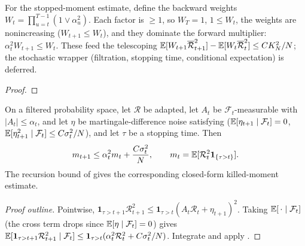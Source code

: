 \begin{lemma}
  \label{lem:back-weight}
  \leanok
  For the stopped-moment estimate, define the backward weights
  $W_t=\prod_{u=t}^{T-1}(1\vee\alpha_u^2)$. Each factor is $\ge1$, so $W_T=1$,
  $1\le W_t$, the weights are nonincreasing ($W_{t+1}\le W_t$), and they dominate the
  forward multiplier: $\alpha_t^2W_{t+1}\le W_t$. These feed the telescoping
  $\mathbb{E}[W_{t+1}\overline{\mathcal R}_{t+1}^2]-\mathbb{E}[W_t\overline{\mathcal R}_t^2]\le CK_N^2/N$;
  the stochastic wrapper (filtration, stopping time, conditional expectation) is deferred.
\end{lemma}
\begin{proof}\leanok\end{proof}

\begin{lemma}
  \label{lem:killed-moment}
  \leanok
  On a filtered probability space, let $\mathcal R$ be adapted, let $A_t$ be
  $\mathcal F_t$-measurable with $|A_t|\le\alpha_t$, and let $\eta$ be
  martingale-difference noise satisfying
  ($\mathbb{E}[\eta_{t+1}\mid\mathcal F_t]=0$, $\mathbb{E}[\eta_{t+1}^2\mid\mathcal F_t]\le C\sigma_t^2/N$),
  and let $\tau$ be a stopping time. Then
  \[
    m_{t+1}\leq\alpha_t^2m_t+\frac{C\sigma_t^2}{N},
    \qquad
    m_t=\mathbb{E}[\mathcal R_t^2\mathbf 1_{\{\tau>t\}}].
  \]
  The recursion bound of  gives the corresponding
  closed-form killed-moment estimate.
\end{lemma}
\begin{proof}[Proof outline]
  \leanok
  Pointwise,
  $\mathbf{1}_{\tau>t+1}\mathcal R_{t+1}^2\le
  \mathbf{1}_{\tau>t}(A_t\mathcal R_t+\eta_{t+1})^2$. Taking
  $\mathbb{E}[\,\cdot\mid\mathcal F_t]$ (the cross term drops since $\mathbb{E}[\eta\mid\mathcal F_t]=0$)
  gives $\mathbb{E}[\mathbf{1}_{\tau>t+1}\mathcal R_{t+1}^2\mid\mathcal F_t]\le
  \mathbf{1}_{\tau>t}(\alpha_t^2\mathcal R_t^2+C\sigma_t^2/N)$.
  Integrate and apply .
\end{proof}

